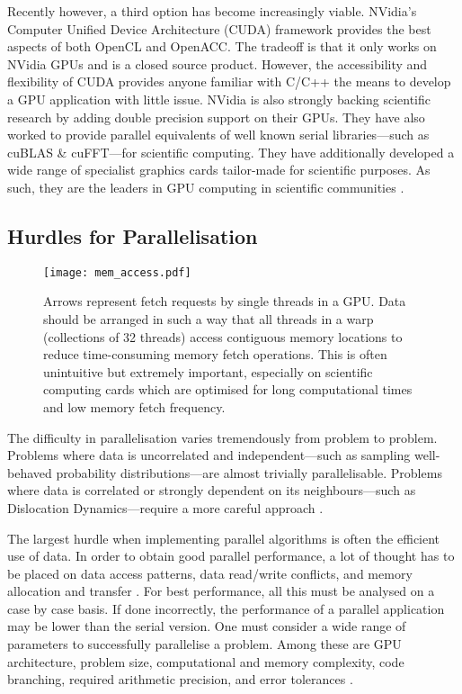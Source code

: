 Recently however, a third option has become increasingly viable. NVidia's Computer Unified Device Architecture (CUDA) framework provides the best aspects of both OpenCL and OpenACC. The tradeoff is that it only works on NVidia GPUs and is a closed source product. However, the accessibility and flexibility of CUDA provides anyone familiar with C/C++ the means to develop a GPU application with little issue. NVidia is also strongly backing scientific research by adding double precision support on their GPUs. They have also worked to provide parallel equivalents of well known serial libraries---such as cuBLAS \& cuFFT---for scientific computing. They have additionally developed a wide range of specialist graphics cards tailor-made for scientific purposes. As such, they are the leaders in GPU computing in scientific communities \cite{nvidia}.

\subsection{Hurdles for Parallelisation}
\begin{figure}[t]
	\centering
	\texttt{[image: mem\_access.pdf]}
	\caption[Memory access pattern example.]{Arrows represent fetch requests by single threads in a GPU. Data should be arranged in such a way that all threads in a warp (collections of 32 threads) access contiguous memory locations to reduce time-consuming memory fetch operations. This is often unintuitive but extremely important, especially on scientific computing cards which are optimised for long computational times and low memory fetch frequency.}
	\label{fig:mem_access}
\end{figure}

The difficulty in parallelisation varies tremendously from problem to problem. Problems where data is uncorrelated and independent---such as sampling well-behaved probability distributions---are almost trivially parallelisable. Problems where data is correlated or strongly dependent on its neighbours---such as Dislocation Dynamics---require a more careful approach \cite{parallel_algs}.

The largest hurdle when implementing parallel algorithms is often the efficient use of data. In order to obtain good parallel performance, a lot of thought has to be placed on data access patterns, data read/write conflicts, and memory allocation and transfer \cite{nvidia}. For best performance, all this must be analysed on a case by case basis. If done incorrectly, the performance of a parallel application may be lower than the serial version. One must consider a wide range of parameters to successfully parallelise a problem. Among these are GPU architecture, problem size, computational and memory complexity, code branching, required arithmetic precision, and error tolerances \cite{nvidia, gpu_rev}.


